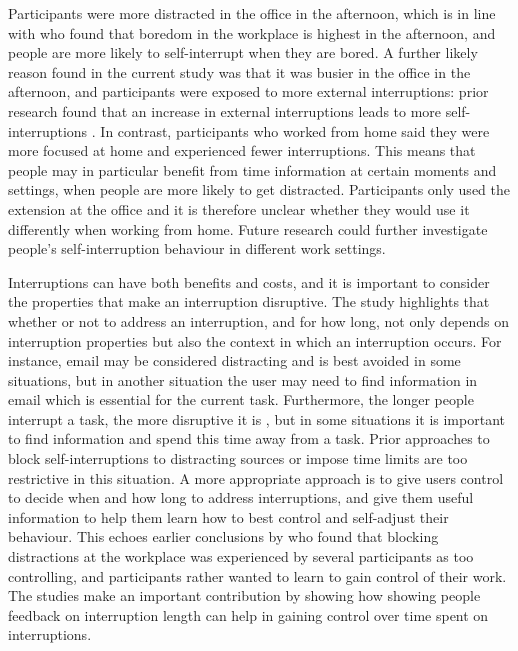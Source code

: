 Participants were more distracted in the office in the afternoon, which is in line with \citet{Mark2014} who found that boredom in the workplace is highest in the afternoon, and people are more likely to self-interrupt when they are bored. A further likely reason found in the current study was that it was busier in the office in the afternoon, and participants were exposed to more external interruptions: prior research found that an increase in external interruptions leads to more self-interruptions \citep{Dabbish2011}. In contrast, participants who worked from home said they were more focused at home and experienced fewer interruptions. This means that people may in particular benefit from time information at certain moments and settings, when people are more likely to get distracted. Participants only used the extension at the office and it is therefore unclear whether they would use it differently when working from home. Future research could further investigate people's self-interruption behaviour in different work settings. 

Interruptions can have both benefits and costs, and it is important to consider the properties that make an interruption disruptive. The study highlights that whether or not to address an interruption, and for how long, not only depends on interruption properties but also the context in which an interruption occurs. For instance, email may be considered distracting and is best avoided in some situations, but in another situation the user may need to find information in email which is essential for the current task. Furthermore, the longer people interrupt a task, the more disruptive it is \citep{Altmann2017, Monk2008}, but in some situations it is important to find information and spend this time away from a task. Prior approaches to block self-interruptions to distracting sources \citep{Kim2017, Mark2018} or impose time limits \citep{Freedom} are too restrictive in this situation. A more appropriate approach is to give users control to decide when and how long to address interruptions, and give them useful information to help them learn how to best control and self-adjust their behaviour. This echoes earlier conclusions by \citet{Mark2018} who found that blocking distractions at the workplace was experienced by several participants as too controlling, and participants rather wanted to learn to gain control of their work. The studies make an important contribution by showing how showing people feedback on interruption length can help in gaining control over time spent on interruptions. 

